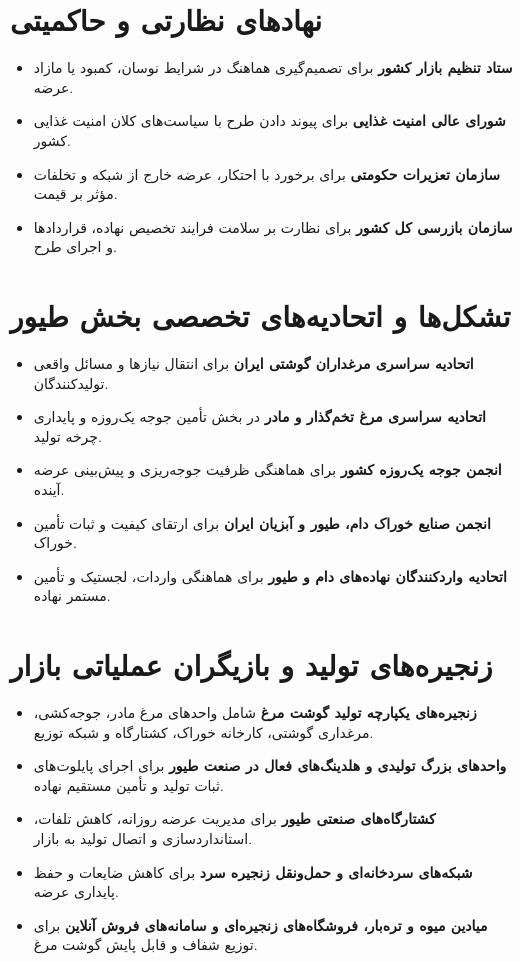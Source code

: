 \documentclass[12pt,a4paper]{report}
\begin{document}
\section{نهادهای نظارتی و حاکمیتی}
\begin{itemize}
    \item \textbf{ستاد تنظیم بازار کشور} برای تصمیم‌گیری هماهنگ در شرایط نوسان، کمبود یا مازاد عرضه.
    \item \textbf{شورای عالی امنیت غذایی} برای پیوند دادن طرح با سیاست‌های کلان امنیت غذایی کشور.
    \item \textbf{سازمان تعزیرات حکومتی} برای برخورد با احتکار، عرضه خارج از شبکه و تخلفات مؤثر بر قیمت.
    \item \textbf{سازمان بازرسی کل کشور} برای نظارت بر سلامت فرایند تخصیص نهاده، قراردادها و اجرای طرح.
\end{itemize}

\section{تشکل‌ها و اتحادیه‌های تخصصی بخش طیور}
\begin{itemize}
    \item \textbf{اتحادیه سراسری مرغداران گوشتی ایران} برای انتقال نیازها و مسائل واقعی تولیدکنندگان.
    \item \textbf{اتحادیه سراسری مرغ تخم‌گذار و مادر} در بخش تأمین جوجه یک‌روزه و پایداری چرخه تولید.
    \item \textbf{انجمن جوجه یک‌روزه کشور} برای هماهنگی ظرفیت جوجه‌ریزی و پیش‌بینی عرضه آینده.
    \item \textbf{انجمن صنایع خوراک دام، طیور و آبزیان ایران} برای ارتقای کیفیت و ثبات تأمین خوراک.
    \item \textbf{اتحادیه واردکنندگان نهاده‌های دام و طیور} برای هماهنگی واردات، لجستیک و تأمین مستمر نهاده.
\end{itemize}

\section{زنجیره‌های تولید و بازیگران عملیاتی بازار}
\begin{itemize}
    \item \textbf{زنجیره‌های یکپارچه تولید گوشت مرغ} شامل واحدهای مرغ مادر، جوجه‌کشی، مرغداری گوشتی، کارخانه خوراک، کشتارگاه و شبکه توزیع.
    \item \textbf{واحدهای بزرگ تولیدی و هلدینگ‌های فعال در صنعت طیور} برای اجرای پایلوت‌های ثبات تولید و تأمین مستقیم نهاده.
    \item \textbf{کشتارگاه‌های صنعتی طیور} برای مدیریت عرضه روزانه، کاهش تلفات، استانداردسازی و اتصال تولید به بازار.
    \item \textbf{شبکه‌های سردخانه‌ای و حمل‌ونقل زنجیره سرد} برای کاهش ضایعات و حفظ پایداری عرضه.
    \item \textbf{میادین میوه و تره‌بار، فروشگاه‌های زنجیره‌ای و سامانه‌های فروش آنلاین} برای توزیع شفاف و قابل پایش گوشت مرغ.
\end{itemize}
\end{document}
